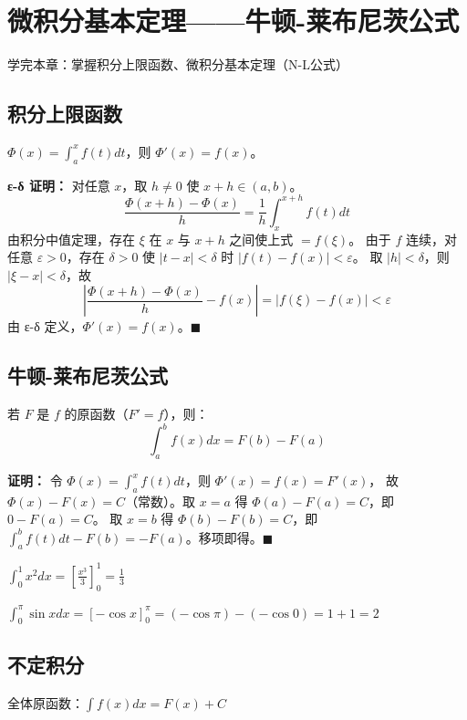 \chapter{微积分基本定理——牛顿-莱布尼茨公式}
\begin{applicationbox}
学完本章：掌握积分上限函数、微积分基本定理（N-L公式）
\end{applicationbox}

\section{积分上限函数} \(\Phi(x)=\int_a^x f(t)dt\)，则 \(\Phi'(x)=f(x)\)。

\textbf{ε-δ 证明：} 对任意 \(x\)，取 \(h\neq0\) 使 \(x+h\in(a,b)\)。
\[
\frac{\Phi(x+h)-\Phi(x)}{h} = \frac1h\int_x^{x+h} f(t)dt
\]
由积分中值定理，存在 \(\xi\) 在 \(x\) 与 \(x+h\) 之间使上式 \(=f(\xi)\)。
由于 \(f\) 连续，对任意 \(\varepsilon>0\)，存在 \(\delta>0\) 使 \(|t-x|<\delta\) 时 \(|f(t)-f(x)|<\varepsilon\)。
取 \(|h|<\delta\)，则 \(|\xi-x|<\delta\)，故
\[
\left|\frac{\Phi(x+h)-\Phi(x)}{h} - f(x)\right| = |f(\xi)-f(x)| < \varepsilon
\]
由 ε-δ 定义，\(\Phi'(x)=f(x)\)。\(\blacksquare\)

\section{牛顿-莱布尼茨公式} 若 \(F\) 是 \(f\) 的原函数（\(F'=f\)），则：
\[\int_a^b f(x)dx = F(b)-F(a)\]

\textbf{证明：} 令 \(\Phi(x)=\int_a^x f(t)dt\)，则 \(\Phi'(x)=f(x)=F'(x)\)，
故 \(\Phi(x)-F(x)=C\)（常数）。取 \(x=a\) 得 \(\Phi(a)-F(a)=C\)，即 \(0-F(a)=C\)。
取 \(x=b\) 得 \(\Phi(b)-F(b)=C\)，即 \(\int_a^b f(t)dt - F(b) = -F(a)\)。移项即得。\(\blacksquare\)

\begin{examplebox}[1] \(\int_0^1 x^2 dx = \left[\frac{x^3}{3}\right]_0^1 = \frac13\)\end{examplebox}
\begin{examplebox}[2] \(\int_0^\pi \sin x dx = [-\cos x]_0^\pi = (-\cos\pi)-(-\cos0)=1+1=2\)\end{examplebox}

\section{不定积分} 全体原函数：\(\int f(x)dx = F(x)+C\)

